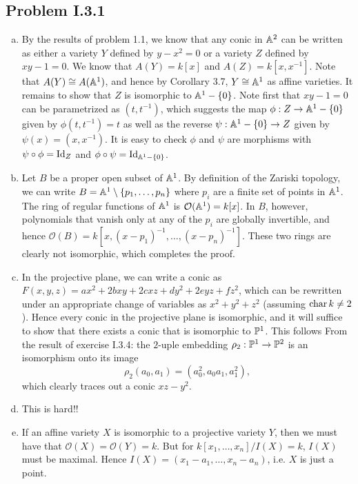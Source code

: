 \documentclass{mathnotes}
\begin{document}
\subsection*{Problem I.3.1}
\begin{enumerate}[(a)]
    \item By the results of problem 1.1, we know that any conic in $\mathbb{A}^2$ can be written as either
        a variety $Y$ defined by $y-x^2=0$ or a variety $Z$ defined by $xy-1=0$. We know that
        $A(Y)=k[x]$ and $A(Z)=k[x,x^{-1}]$. Note that $A(Y)\cong A(\mathbb{A}^1)$, and hence by Corollary
        3.7, $Y\cong\mathbb{A}^1$ as affine varieties. It remains to show that $Z$ is isomorphic to
        $\mathbb{A}^1-\{0\}$. Note first that $xy-1=0$ can be parametrized as $(t,t^{-1})$, which
        suggests the map $\phi:Z\to\mathbb{A}^1-\{0\}$ given by $\phi(t,t^{-1})=t$ as well as the reverse
        $\psi:\mathbb{A}^1-\{0\}\to Z$ given by $\psi(x)=(x,x^{-1})$. It is easy to check $\phi$ and $\psi$
        are morphisms with $\psi\circ\phi=\operatorname{Id}_Z$ and $\phi\circ\psi=\operatorname{Id}_{\mathbb{A}^1-\{0\}}$.
    \item Let $B$ be a proper open subset of $\mathbb{A}^1$. By definition of the Zariski topology, we can
        write $B=\mathbb{A}^1\setminus\{p_1,\ldots, p_n\}$ where $p_i$ are a finite set of points in $\mathbb{A}^1$.
        The ring of regular functions of $\mathbb{A}^1$ is $\mathcal{O}(\mathbb{A}^1)=k[x]$. In $B$, however,
        polynomials that vanish only at any of the $p_i$ are globally invertible, and hence
        $\mathcal{O}(B)=k[x,(x-p_1)^{-1},\ldots,(x-p_n)^{-1}]$. These two rings are clearly
        not isomorphic, which completes the proof.
    \item In the projective plane, we can write a conic as $F(x,y,z)=ax^2+2bxy+2cxz+dy^2+2eyz+fz^2$,
        which can be rewritten under an appropriate change of variables as $x^2+y^2+z^2$ (assuming
        $\operatorname{char} k\neq 2$). Hence every
        conic in the projective plane is isomorphic, and it will suffice to show that there exists
        a conic that is isomorphic to $\mathbb{P}^1$.
        This follows From the result of exercise I.3.4: the $2$-uple embedding 
        $\rho_2:\mathbb{P}^1\to\mathbb{P}^2$ is an isomorphism onto its image
        \[\rho_2(a_0,a_1)=(a_0^2,a_0a_1,a_1^2),\]
        which clearly traces out a conic $xz-y^2$.
    \item This is hard!! 
    \item If an affine variety $X$ is isomorphic to a projective variety $Y$, then we must have
        that $\mathcal{O}(X)=\mathcal{O}(Y)=k$. But for $k[x_1,\ldots,x_n]/I(X)=k$, $I(X)$
        must be maximal. Hence $I(X)=(x_1-a_1,\ldots,x_n-a_n)$, i.e. $X$ is just a point.
\end{enumerate}
\end{document}
